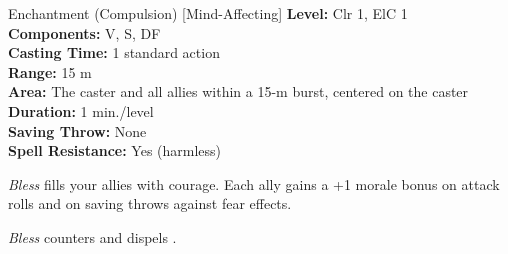 {Enchantment (Compulsion) [Mind-Affecting]}
{
	\textbf{Level:}
	Clr 1, ElC 1\\
	\textbf{Components:}
	V, S, DF\\
	\textbf{Casting Time:}
	1 standard action\\
	\textbf{Range:}
	15 m\\
	\textbf{Area:}
	The caster and all allies within a 15-m burst, centered on the caster\\
	\textbf{Duration:}
	1 min./level\\
	\textbf{Saving Throw:}
	None\\
	\textbf{Spell Resistance:}
	Yes (harmless)\\
}
{
	\emph{Bless} fills your allies with courage. Each ally gains a +1 morale bonus on attack rolls and on saving throws against fear effects.

	\emph{Bless} counters and dispels .

}
